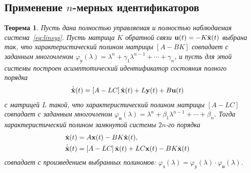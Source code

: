 \documentclass[a4paper,14pt]{article}
\newtheorem{theorem}{Теорема}
\theoremstyle{definition}
\begin{document}
\subsection{Применение $n$-мерных идентификаторов}

\begin{theorem}
  Пусть дана полностью управляемая и полностью наблюдаемая система~\eqref{eq:linsys}. Пусть
  матрица $K$ обратной связи $\vb{u}(t) = -K\hat{\vb{x}}(t)$ выбрана так, что характеристический
  полином матрицы $\left[A - BK\right]$ совпадает с заданным многочленом
  $\varphi_{\text{у}}(\lambda) = \lambda^n + \gamma_1 \lambda^{n-1} + \cdots + \gamma_n$,
  и пусть для этой системы построен асимптотический идентификатор состояния полного порядка
  \begin{equation*}
    \dot{\hat{\vb{x}}}(t) = \left[A - LC\right] \hat{\vb{x}}(t) + L \vb{y}(t) + B \vb{u}(t)
  \end{equation*}
  с матрицей $L$ такой, что характеристический полином матрицы $\left[A - LC\right]$
  совпадает с заданным многочленом $\varphi_{\text{и}}(\lambda) = \lambda^n + \beta_1 \lambda^{n-1} + \cdots + \beta_n$.
  Тогда характеристический полином замкнутой системы $2n$-го порядка
  \begin{equation}
    \begin{aligned}
      \dot{\vb{x}}(t) &= A \vb{x}(t) - BK \hat{\vb{x}}(t), \\
      \dot{\hat{\vb{x}}}(t) &= \left[A - LC\right] \hat{\vb{x}}(t)
      + LC \vb{x}(t) - BK \hat{\vb{x}}(t)
    \end{aligned}
  \end{equation}
  совпадает с произведением выбранных полиномов: $\varphi_{\text{з}}(\lambda) = \varphi_{\text{у}}(\lambda) \cdot \varphi_{\text{и}}(\lambda)$.
\end{theorem}
\end{document}
